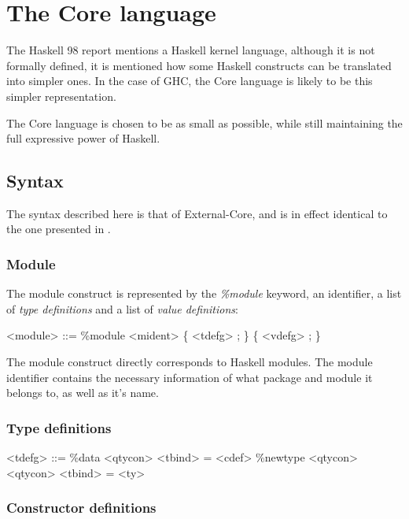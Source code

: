 
\chapter{The Core language}

The Haskell 98 report mentions a Haskell kernel language, although it is not
formally defined, it is mentioned how some Haskell constructs can be translated into
simpler ones. In the case of GHC, the Core language is likely to be this simpler 
representation.

The Core language is chosen to be as small as possible, while still maintaining 
the full expressive power of Haskell.


\section{Syntax}

The syntax described here is that of External-Core, and is in effect identical to the
one presented in \cite{tolmach2010ghc}. 

\subsection{Module}

The module construct is represented by the \emph{\%module} keyword, an identifier,
a list of \emph{type definitions} and a list of \emph{value definitions}:

\begin{grammar}
<module> ::= \%module <mident> \{ <tdefg> ; \} \{ <vdefg> ; \}
\end{grammar}

The module construct directly corresponds to Haskell modules. The module identifier
contains the necessary information of what package and module it belongs to, as
well as it's name.

\subsection{Type definitions}

\begin{grammar}
<tdefg> ::= \%data <qtycon> <tbind> = <cdef>
       \alt \%newtype <qtycon> <qtycon> <tbind> = <ty>
\end{grammar}


\subsection{Constructor definitions}

